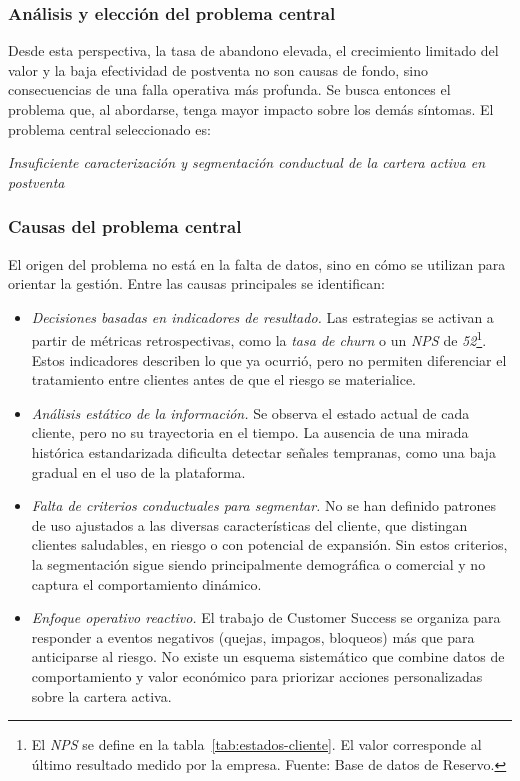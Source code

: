 \subsubsection{Análisis y elección del problema central}

Desde esta perspectiva, la tasa de abandono elevada, el crecimiento limitado del valor y la baja efectividad de postventa no son causas de fondo, sino consecuencias de una falla operativa más profunda. Se busca entonces el problema que, al abordarse, tenga mayor impacto sobre los demás síntomas. El problema central seleccionado es:

\begin{center}
    \textit{\textit{Insuficiente caracterización y segmentación conductual de la cartera activa en postventa}}
\end{center}

\subsubsection{Causas del problema central}

El origen del problema no está en la falta de datos, sino en cómo se utilizan para orientar la gestión. Entre las causas principales se identifican:

\begin{itemize}
    \item \textit{Decisiones basadas en indicadores de resultado.} Las estrategias se activan a partir de métricas retrospectivas, como la \textit{tasa de churn} o un \textit{NPS} de \textit{52}\footnote{El \textit{NPS} se define en la tabla~\ref{tab:estados-cliente}. El valor corresponde al último resultado medido por la empresa. Fuente: Base de datos de Reservo.}. Estos indicadores describen lo que ya ocurrió, pero no permiten diferenciar el tratamiento entre clientes antes de que el riesgo se materialice.

    \item \textit{Análisis estático de la información.} Se observa el estado actual de cada cliente, pero no su trayectoria en el tiempo. La ausencia de una mirada histórica estandarizada dificulta detectar señales tempranas, como una baja gradual en el uso de la plataforma.

    \item \textit{Falta de criterios conductuales para segmentar.} No se han definido patrones de uso ajustados a las diversas características del cliente, que distingan clientes saludables, en riesgo o con potencial de expansión. Sin estos criterios, la segmentación sigue siendo principalmente demográfica o comercial y no captura el comportamiento dinámico.

    \item \textit{Enfoque operativo reactivo.} El trabajo de Customer Success se organiza para responder a eventos negativos (quejas, impagos, bloqueos) más que para anticiparse al riesgo. No existe un esquema sistemático que combine datos de comportamiento y valor económico para priorizar acciones personalizadas sobre la cartera activa.
\end{itemize}

